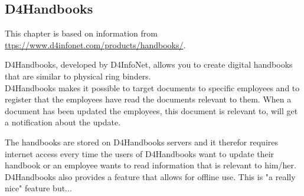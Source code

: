 \subsection{D4Handbooks}
This chapter is based on information from \url{ttps://www.d4infonet.com/products/handbooks/}.

D4Handbooks, developed by D4InfoNet, allows you to create digital handbooks that are similar to physical ring binders.\\
D4Handbooks makes it possible to target documents to specific employees and to register that the employees have read the documents relevant to them. When a document has been updated the employees, this document is relevant to, will get a notification about the update.

The handbooks are stored on D4Handbooks servers and it therefor requires internet access every time the users of D4Handbooks want to update their handbook or an employee wants to read information that is relevant to him/her.\\
D4Handbooks also provides a feature that allows for offline use. This is "a really nice" feature but... %

